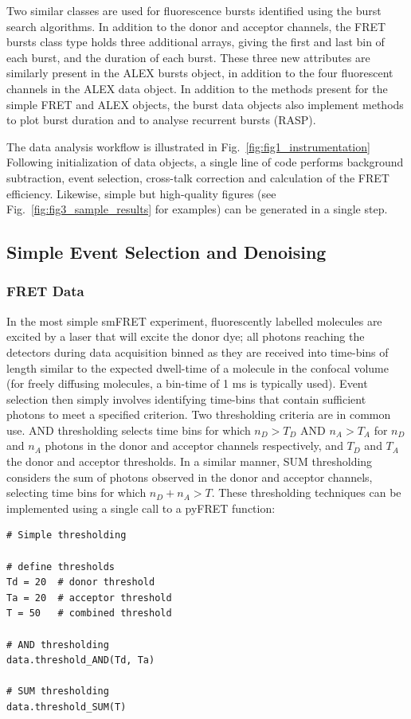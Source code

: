 \documentclass[10pt]{article}
\begin{document}
Two similar classes are used for fluorescence bursts identified using the burst search algorithms. In addition to the donor and acceptor channels, the FRET bursts class type holds three additional arrays, giving the first and last bin of each burst, and the duration of each burst. These three new attributes are similarly present in the ALEX bursts object, in addition to the four fluorescent channels in the ALEX data object. In addition to the methods present for the simple FRET and ALEX objects, the burst data objects also implement methods to plot burst duration and to analyse recurrent bursts (RASP). 

The data analysis workflow is illustrated in Fig.~\ref{fig:fig1_instrumentation} Following initialization of data objects, a single line of code performs background subtraction, event selection, cross-talk correction and calculation of the FRET efficiency. Likewise, simple but high-quality figures (see Fig.~\ref{fig:fig3_sample_results} for examples) can be generated in a single step.

\subsection*{Simple Event Selection and Denoising}
\subsubsection*{FRET Data}
In the most simple smFRET experiment, fluorescently labelled molecules are excited by a laser that will excite the donor dye; all photons reaching the detectors during data acquisition binned as they are received into time-bins of length similar to the expected dwell-time of a molecule in the confocal volume (for freely diffusing molecules, a bin-time of 1 ms is typically used). Event selection then simply involves identifying time-bins that contain sufficient photons to meet a specified criterion. Two thresholding criteria are in common use. AND thresholding selects time bins for which $n_D > T_D$ AND $n_A > T_A$ for $n_D$ and $n_A$ photons in the donor and acceptor channels respectively, and $T_D$ and $T_A$ the donor and acceptor thresholds. In a similar manner, SUM thresholding considers the sum of photons observed in the donor and acceptor channels, selecting time bins for which $n_D + n_A > T$. These thresholding techniques can be implemented using a single call to a pyFRET function: 

\begin{lstlisting}
# Simple thresholding

# define thresholds
Td = 20  # donor threshold
Ta = 20  # acceptor threshold
T = 50   # combined threshold

# AND thresholding
data.threshold_AND(Td, Ta)

# SUM thresholding
data.threshold_SUM(T)
\end{lstlisting}
\end{document}
